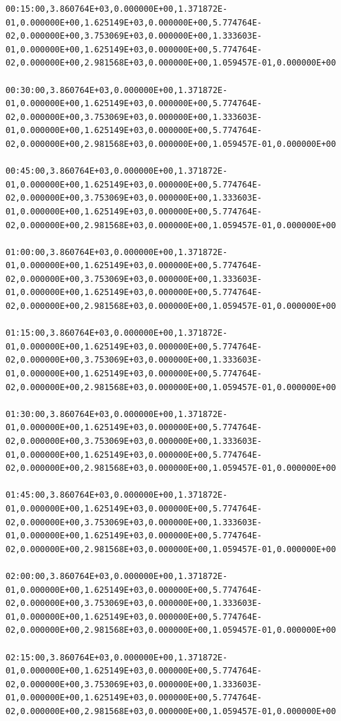 \begin{lstlisting}
00:15:00,3.860764E+03,0.000000E+00,1.371872E-01,0.000000E+00,1.625149E+03,0.000000E+00,5.774764E-02,0.000000E+00,3.753069E+03,0.000000E+00,1.333603E-01,0.000000E+00,1.625149E+03,0.000000E+00,5.774764E-02,0.000000E+00,2.981568E+03,0.000000E+00,1.059457E-01,0.000000E+00

00:30:00,3.860764E+03,0.000000E+00,1.371872E-01,0.000000E+00,1.625149E+03,0.000000E+00,5.774764E-02,0.000000E+00,3.753069E+03,0.000000E+00,1.333603E-01,0.000000E+00,1.625149E+03,0.000000E+00,5.774764E-02,0.000000E+00,2.981568E+03,0.000000E+00,1.059457E-01,0.000000E+00

00:45:00,3.860764E+03,0.000000E+00,1.371872E-01,0.000000E+00,1.625149E+03,0.000000E+00,5.774764E-02,0.000000E+00,3.753069E+03,0.000000E+00,1.333603E-01,0.000000E+00,1.625149E+03,0.000000E+00,5.774764E-02,0.000000E+00,2.981568E+03,0.000000E+00,1.059457E-01,0.000000E+00

01:00:00,3.860764E+03,0.000000E+00,1.371872E-01,0.000000E+00,1.625149E+03,0.000000E+00,5.774764E-02,0.000000E+00,3.753069E+03,0.000000E+00,1.333603E-01,0.000000E+00,1.625149E+03,0.000000E+00,5.774764E-02,0.000000E+00,2.981568E+03,0.000000E+00,1.059457E-01,0.000000E+00

01:15:00,3.860764E+03,0.000000E+00,1.371872E-01,0.000000E+00,1.625149E+03,0.000000E+00,5.774764E-02,0.000000E+00,3.753069E+03,0.000000E+00,1.333603E-01,0.000000E+00,1.625149E+03,0.000000E+00,5.774764E-02,0.000000E+00,2.981568E+03,0.000000E+00,1.059457E-01,0.000000E+00

01:30:00,3.860764E+03,0.000000E+00,1.371872E-01,0.000000E+00,1.625149E+03,0.000000E+00,5.774764E-02,0.000000E+00,3.753069E+03,0.000000E+00,1.333603E-01,0.000000E+00,1.625149E+03,0.000000E+00,5.774764E-02,0.000000E+00,2.981568E+03,0.000000E+00,1.059457E-01,0.000000E+00

01:45:00,3.860764E+03,0.000000E+00,1.371872E-01,0.000000E+00,1.625149E+03,0.000000E+00,5.774764E-02,0.000000E+00,3.753069E+03,0.000000E+00,1.333603E-01,0.000000E+00,1.625149E+03,0.000000E+00,5.774764E-02,0.000000E+00,2.981568E+03,0.000000E+00,1.059457E-01,0.000000E+00

02:00:00,3.860764E+03,0.000000E+00,1.371872E-01,0.000000E+00,1.625149E+03,0.000000E+00,5.774764E-02,0.000000E+00,3.753069E+03,0.000000E+00,1.333603E-01,0.000000E+00,1.625149E+03,0.000000E+00,5.774764E-02,0.000000E+00,2.981568E+03,0.000000E+00,1.059457E-01,0.000000E+00

02:15:00,3.860764E+03,0.000000E+00,1.371872E-01,0.000000E+00,1.625149E+03,0.000000E+00,5.774764E-02,0.000000E+00,3.753069E+03,0.000000E+00,1.333603E-01,0.000000E+00,1.625149E+03,0.000000E+00,5.774764E-02,0.000000E+00,2.981568E+03,0.000000E+00,1.059457E-01,0.000000E+00


\end{lstlisting}
